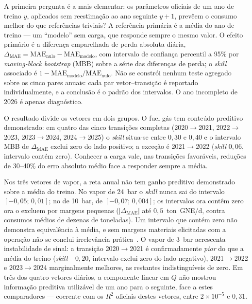 A primeira pergunta é a mais elementar: os parâmetros oficiais
de um ano de treino $y$, aplicados sem reestimação ao ano seguinte $y{+}1$,
prevêem o consumo melhor do que referências triviais? A referência primária é
a média do ano de treino --- um ``modelo'' sem carga, que responde sempre o
mesmo valor. O efeito primário é a diferença emparelhada de perda absoluta
diária, $\Delta_{\mathrm{MAE}} = \mathrm{MAE}_{\mathrm{nulo}} -
\mathrm{MAE}_{\mathrm{modelo}}$, com intervalo de confiança percentil a 95\%
por \emph{moving-block bootstrap} (MBB) sobre a série das diferenças de
perda; o \emph{skill} associado é
$1 - \mathrm{MAE}_{\mathrm{modelo}}/\mathrm{MAE}_{\mathrm{nulo}}$. Não se
constrói nenhum teste agregado sobre os cinco pares anuais: cada par
vetor--transição é reportado individualmente, e a conclusão é o padrão dos
intervalos. O ano incompleto de 2026 é apenas diagnóstico.

O resultado divide os vetores em dois grupos. O fuel gás tem conteúdo
preditivo demonstrado: em quatro das cinco transições completas
(2020${\to}$2021, 2022${\to}$2023, 2023${\to}$2024, 2024${\to}$2025) o
\emph{skill} situa-se entre $0{,}30$ e $0{,}40$ e o intervalo MBB de
$\Delta_{\mathrm{MAE}}$ exclui zero do lado positivo; a exceção é
2021${\to}$2022 (\emph{skill} $0{,}06$, intervalo contém zero). Conhecer a
carga vale, nas transições favoráveis, reduções de 30--40\% do erro absoluto
médio face a responder sempre a média.

Nos três vetores de vapor, a reta anual não tem ganho preditivo
demonstrado sobre a média do treino. No vapor de 24~bar o \emph{skill} nunca
sai do intervalo $[-0{,}05;\,0{,}01]$; no de 10~bar, de $[-0{,}07;\,0{,}004]$;
os intervalos ora contêm zero ora o excluem por margens pequenas
($|\Delta_{\mathrm{MAE}}|$ até $0{,}5$~ton~GNE/d, contra consumos médios de
dezenas de toneladas). Um intervalo que contém zero não demonstra
equivalência à média, e sem margens materiais elicitadas com a operação não
se conclui irrelevância prática~\cite{Lakens2017}. O vapor de 3~bar acrescenta instabilidade de sinal: a
transição 2020${\to}$2021 é confirmadamente \emph{pior} do que a média do
treino (\emph{skill} $-0{,}20$, intervalo exclui zero do lado negativo),
2021${\to}$2022 e 2023${\to}$2024 marginalmente melhores, as restantes
indistinguíveis de zero. Em três dos quatro vetores diários, a componente
linear em $Q$ não mostrou informação preditiva utilizável de um ano para o
seguinte, face a estes comparadores
--- coerente com os $R^2$ oficiais destes vetores, entre $2\times10^{-5}$ e
$0{,}31$.

